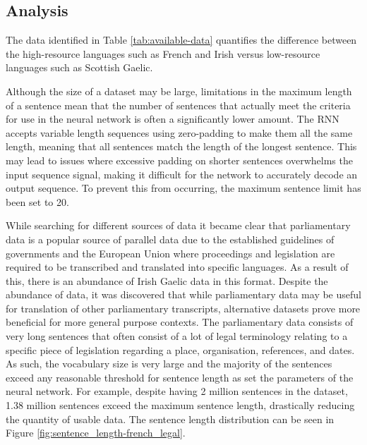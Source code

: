 \subsection{Analysis}

The data identified in Table \ref{tab:available-data} quantifies the difference between the high-resource languages such as French and Irish versus low-resource languages such as Scottish Gaelic. 



Although the size of a dataset may be large, limitations in the maximum length of a sentence mean that the number of sentences that actually meet the criteria for use in the neural network is often a significantly lower amount. The RNN accepts variable length sequences using zero-padding to make them all the same length, meaning that all sentences match the length of the longest sentence. This may lead to issues where excessive padding on shorter sentences overwhelms the input sequence signal, making it difficult for the network to accurately decode an output sequence. To prevent this from occurring, the maximum sentence limit has been set to 20.

While searching for different sources of data it became clear that parliamentary data is a popular source of parallel data due to the established guidelines of governments and the European Union where proceedings and legislation are required to be transcribed and translated into specific languages. As a result of this, there is an abundance of Irish Gaelic data in this format. Despite the abundance of data, it was discovered that while parliamentary data may be useful for translation of other parliamentary transcripts, alternative datasets prove more beneficial for more general purpose contexts. The parliamentary data consists of very long sentences that often consist of a lot of legal terminology relating to a specific piece of legislation regarding a place, organisation, references, and dates. 
As such, the vocabulary size is very large and the majority of the sentences exceed any reasonable threshold for sentence length as set the parameters of the neural network. For example, despite having 2 million sentences in the \cite{french_corpus_2005} dataset, 1.38 million sentences exceed the maximum sentence length, drastically reducing the quantity of usable data. The sentence length distribution can be seen in Figure \ref{fig:sentence_length-french_legal}.

